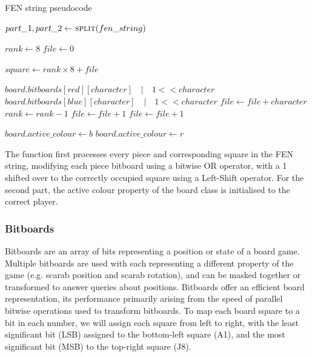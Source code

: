 \documentclass[../main/main.tex]{subfiles}
\begin{document}
\begin{algorithm}[H]
\caption{FEN string pseudocode}
\label{alg:fen-string}
\begin{algorithmic}
        \State $part\_1, part\_2 \gets \Call{split}{fen\_string}$

        \State$rank \gets 8$
        \State$file \gets 0$

        \bigskip

            \State$square \gets rank \times 8 + file$

                    \State $board.bitboards[red][character] \quad | \quad 1 << character$
                \Else
                    \State $board.bitboards[blue][character] \quad | \quad 1 << character$
                \EndIf
                \State $file \gets file + character$
                \State $rank \gets rank - 1$
                \State $file \gets file + 1$
            \Else
                \State $file \gets file + 1$
            \EndIf
        
        \bigskip

            \State $board.active\_colour \gets b$
        \Else
            \State $board.active\_colour \gets r$
        \EndIf
        \EndFor
    \EndFunction
\end{algorithmic}
\end{algorithm}

The function first processes every piece and corresponding square in the FEN string, modifying each piece bitboard using a bitwise OR operator, with a 1 shifted over to the correctly occupied square using a Left-Shift operator. For the second part, the active colour property of the board class is initialised to the correct player.

\subsubsection*{Bitboards}
Bitboards are an array of bits representing a position or state of a board game. Multiple bitboards are used with each representing a different property of the game (e.g. scarab position and scarab rotation), and can be masked together or transformed to answer queries about positions. Bitboards offer an efficient board representation, its performance primarily arising from the speed of parallel bitwise operations used to transform bitboards.
To map each board square to a bit in each number, we will assign each square from left to right, with the least significant bit (LSB) assigned to the bottom-left square (A1), and the most significant bit (MSB) to the top-right square (J8).
\end{document}
